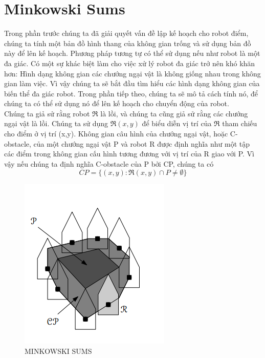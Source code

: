 \documentclass[a4paper,12pt]{report}
\begin{document}
\section{Minkowski Sums}
Trong phần trước chúng ta đã giải quyết vấn đề lập kế hoạch cho robot điểm, chúng ta tính một bản đồ hình thang của không gian trống và sử dụng bản đồ này để lên kế hoạch. Phương pháp tương tự có thể sử dụng nếu như robot là một đa giác. Có một sự khác biệt làm cho việc xử lý robot đa giác trở nên khó khăn hơn: Hình dạng không gian các chướng ngại vật là không giống nhau trong không gian làm việc. Vì vậy chúng ta sẽ bắt đầu tìm hiểu các hình dạng không gian của biến thể đa giác robot. Trong phần tiếp theo, chúng ta sẽ mô tả cách tính nó, để chúng ta có thể sử dụng nó để lên kế hoạch cho chuyển động của robot.
\\
Chúng ta giả sử rằng robot $\Re$ là lồi, và chúng ta cũng giả sử rằng các chướng ngại vật là lồi. Chúng ta sử dụng $\Re(x,y)$ để biểu diễn vị trí của $\Re$ tham chiếu cho điểm ở vị trí (x,y). Không gian câu hình của chướng ngại vật, hoặc C-obstacle, của một chướng ngại vật   P và robot R được định nghĩa như một tập các điểm trong không gian cấu hình tương  đương với vị trí của R giao với P. Vì vậy nếu chúng ta định nghĩa C-obstacle của P bởi CP, chúng ta có
\begin{displaymath}
CP = \{(x,y): \Re(x,y)\cap P \neq \emptyset \}
\end{displaymath}
\begin{minipage}[b]{0.45\linewidth}
\begin{figure}[H]
\centering
\includegraphics[width=0.8\linewidth]{1.png}
\caption{MINKOWSKI SUMS}
\end{figure}
\end{minipage}
\end{document}
